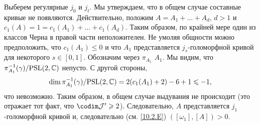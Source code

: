 Выберем регулярные $j_0$ и $j_t$.
Мы утверждаем, что в общем случае составные кривые не появляются.
Действительно, положим $A = A_1 +\dots + A_d$, $d > 1$ и $c_1 (A) = 1
= c_1 (A_1) +\dots + c_1 (A_d)$. 
Таким образом, по крайней мере один из классов Черна в правой части неположителен.
Не умоляя общности можно предположить, что $c_1 (A_1) \le 0$ и что
$A_1$ представляется $j_s$-голоморфной кривой для некоторого $s \in
[0, 1]$. 
Обозначим через $\pi_{A_1}$  $A_1$.
Мы видим, что $\pi_{A_1}^{-1} (\gamma)/\mathrm{PSL}(2, \mathbb{C})$ непусто.
С другой стороны, 
\[\dim \pi_{A_1}^{-1} (\gamma)/\mathrm{PSL}(2, \mathbb{C}) = 2(c_1 (A_1) + 2) - 6 + 1 \leqslant -1,\]
что невозможно.
Таким образом, в общем случае выдувания не происходит (это отражает
тот факт, что $\codim \mathcal{J}' \ge 2$). 
Следовательно, $A$ представляется $j_1$-голоморфной кривой и,
следовательно (см. \ref{10.2.E}) $([\omega_1], [A]) > 0$.  
